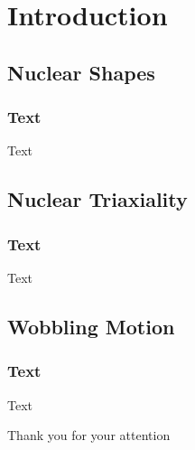 \documentclass{beamer}
\begin{document}
\section{Introduction}

\begin{frame}
\end{frame}

\subsection{Nuclear Shapes}
\begin{frame}
    \frametitle{Text}
    Text
\end{frame}
\subsection{Nuclear Triaxiality}
\begin{frame}
    \frametitle{Text}
    Text
\end{frame}
\subsection{Wobbling Motion}
\begin{frame}
    \frametitle{Text}
    Text
\end{frame}

\begin{frame}[plain] %
	\begin{center}
		\bigskip\bigskip %
		{\Huge Thank you for your attention \faHeart}
	\end{center}
\end{frame}
\end{document}
